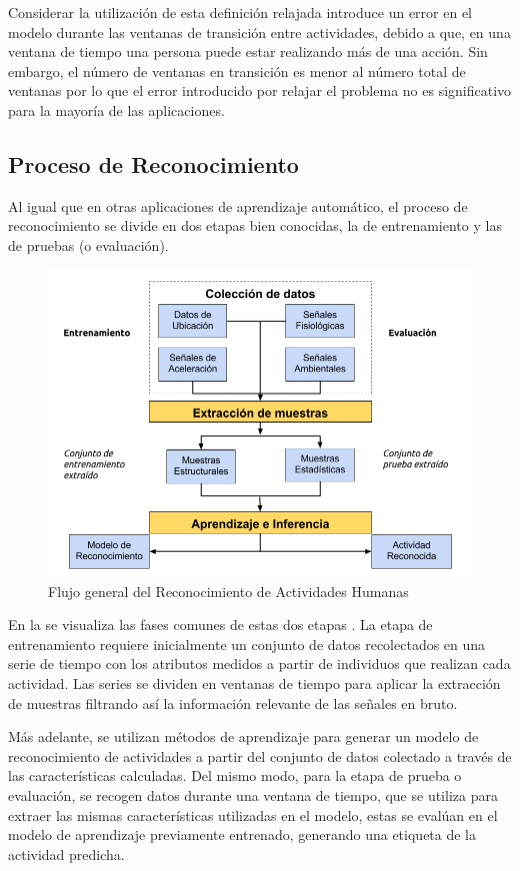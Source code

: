 Considerar la utilización de esta definición relajada introduce un
error en el modelo durante las ventanas de transición entre actividades,
debido a que, en una ventana de tiempo una persona puede estar realizando
más de una acción. Sin embargo, el número de ventanas en transición
es menor al número total de ventanas por lo que el error introducido
por relajar el problema no es significativo para la mayoría de las
aplicaciones.

\subsection{Proceso de Reconocimiento }

\label{sec262:proceso-har}Al igual que en otras aplicaciones de aprendizaje
automático, el proceso de reconocimiento se divide en dos etapas bien
conocidas, la de entrenamiento y las de pruebas (o evaluación).

\begin{figure}[!htbp]
\centering{} \includegraphics[width=0.7\linewidth]{capitulo-2/graphics/harsystem}
\caption[Flujograma HAR]{\label{fig2:harsystem}Flujo general del Reconocimiento de Actividades
Humanas}
 
\end{figure}

En la  se visualiza las fases comunes de estas
dos etapas \cite{LaraLabrador2013}. La etapa de entrenamiento requiere
inicialmente un conjunto de datos recolectados en una serie de tiempo
con los atributos medidos a partir de individuos que realizan cada
actividad. Las series se dividen en ventanas de tiempo para aplicar
la extracción de muestras filtrando así la información relevante de
las señales en bruto. 

Más adelante, se utilizan métodos de aprendizaje para generar un modelo
de reconocimiento de actividades a partir del conjunto de datos colectado
a través de las características calculadas. Del mismo modo, para la
etapa de prueba o evaluación, se recogen datos durante una ventana
de tiempo, que se utiliza para extraer las mismas características
utilizadas en el modelo, estas se evalúan en el modelo de aprendizaje
previamente entrenado, generando una etiqueta de la actividad predicha.

